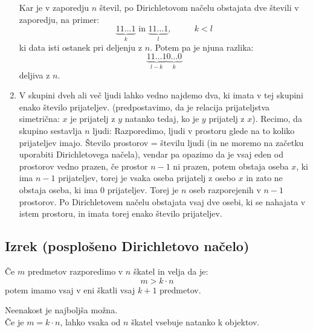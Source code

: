 \begin{enumerate}[label=\roman*.]
    Kar je v zaporedju $n$ števil, po Dirichletovom načelu obstajata dve števili v zaporedju, na primer:
    $$
    \underset{k}{\underbrace{11\ldots 1}} \text{ in } \underset{l}{\underbrace{11\ldots 1}}, \text{ } \text{ }\text{ }\text{ } k < l
    $$
    ki data isti ostanek pri deljenju z $n$. Potem pa je njuna razlika:
    $$
    \underset{l - k}{\underbrace{11\ldots 1}}\underset{k}{\underbrace{0 \ldots 0}}
    $$
    deljiva z $n$.
    \item V skupini dveh ali več ljudi lahko vedno najdemo dva, ki imata v tej skupini enako število prijateljev. (predpostavimo, da je relacija prijateljstva simetrična: $x$ je prijatelj z $y$ natanko tedaj, ko je $y$ prijatelj z $x$). Recimo, da skupino sestavlja $n$ ljudi: Razporedimo, ljudi v prostoru glede na to koliko prijateljev imajo.
    Število prostorov = številu ljudi (in ne moremo na začetku uporabiti Dirichletovega načela), vendar pa opazimo da je vsaj eden od prostorov vedno prazen, če prostor $n - 1$ ni prazen, potem obstaja oseba $x$, ki ima $n - 1$ prijateljev, torej je vsaka oseba prijatelj z osebo $x$ in zato ne obstaja oseba, ki ima 0 prijateljev.
    Torej je $n$ oseb razporejenih v $n-1$ prostorov. Po Dirichletovem načelu obstajata vsaj dve osebi, ki se nahajata v istem prostoru, in imata torej enako število prijateljev.
\end{enumerate}


\subsection{Izrek (posplošeno Dirichletovo načelo)}
Če $m$ predmetov razporedimo v $n$ škatel in velja da je:
$$
m > k \cdot n
$$
potem imamo vsaj v eni škatli vsaj $k + 1$ predmetov.
\begin{opomba}
    Neenakost je najboljša možna. \\
    Če je $m = k \cdot n$, lahko vsaka od $n$ škatel vsebuje natanko k objektov.
\end{opomba}


